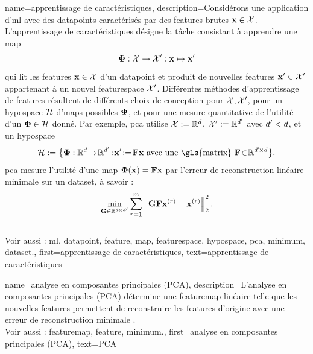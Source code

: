 {name={apprentissage de caractéristiques},
	description={Considérons une application d'\gls{ml} avec des \glspl{datapoint} caractérisés par 
		des \glspl{feature} brutes ${\bf x} \in \mathcal{X}$. L'apprentissage de caractéristiques 
		désigne la tâche consistant à apprendre une \gls{map}
		$$
		{\bf \Phi}: \mathcal{X} \rightarrow \mathcal{X}': {\bf x} \mapsto {\bf x}'
		$$ 
		qui lit les \glspl{feature} ${\bf x} \in \mathcal{X}$ d’un \gls{datapoint} et produit de 
		nouvelles \glspl{feature} ${\bf x}' \in \mathcal{X}'$ appartenant à un nouvel \gls{featurespace} $\mathcal{X}'$. 
		Différentes méthodes d'apprentissage de \glspl{feature} résultent de différents choix de conception pour 
		$\mathcal{X}, \mathcal{X}'$, pour un \gls{hypospace} $\mathcal{H}$ 
		d'\glspl{map} possibles ${\bf \Phi}$, et pour une mesure quantitative 
		de l’utilité d’un ${\bf \Phi} \in \mathcal{H}$ donné. Par exemple, \gls{pca} 
		utilise $\mathcal{X} := \mathbb{R}^{d}$, $\mathcal{X}' := \mathbb{R}^{d'}$ 
		avec $d' < d$, et un \gls{hypospace}
		$$
		\hypospace\defeq \big\{ \featuremapvec: \mathbb{R}^{\dimlocalmodel}
		\!\rightarrow\! \mathbb{R}^{\dimlocalmodel'}\!:\!\featurevec'\!\defeq\!\mF \featurevec \mbox{ avec une \gls{matrix} } \mF \!\in\! \mathbb{R}^{\dimlocalmodel' \!\times \dimlocalmodel} \big\}.
		$$
		\gls{pca} mesure l'utilité d'une \gls{map} ${\bf \Phi}({\bf x})= \mathbf{F} {\bf x}$ 
		par l’erreur de reconstruction linéaire minimale sur un \gls{dataset}, à savoir :
		$$
		\min_{\mG \in \mathbb{R}^{\dimlocalmodel \!\!\!\times \dimlocalmodel'}} \sum_{\sampleidx=1}^{\samplesize} \normgeneric{\mG \mF \featurevec^{(\sampleidx)} - \featurevec^{(\sampleidx)}}{2}^{2}.
		$$
		\\
		Voir aussi : \gls{ml}, \gls{datapoint}, \gls{feature}, \gls{map}, \gls{featurespace}, \gls{hypospace}, \gls{pca}, \gls{minimum}, \gls{dataset}.},
	first={apprentissage de caractéristiques},
	text={apprentissage de caractéristiques}
}

{name={analyse en composantes principales (PCA)}, 
	description={L’analyse en composantes principales (PCA) 
		détermine une \gls{featuremap} linéaire telle que les nouvelles \glspl{feature} 
		permettent de reconstruire les \glspl{feature} d’origine avec une erreur de reconstruction minimale \cite{MLBasics}.
		\\
		Voir aussi : \gls{featuremap}, \gls{feature}, \gls{minimum}.},
	first={analyse en composantes principales (PCA)},
	text={PCA} 
}


